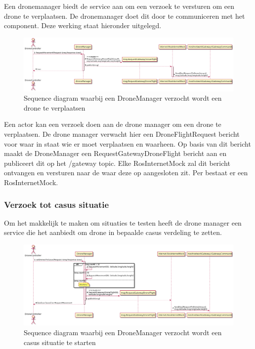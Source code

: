 \documentclass[a4paper, 11pt, oneside]{report}
\begin{document}
Een dronemanager biedt de service aan om een verzoek te versturen om een drone te verplaatsen. 
De dronemanager doet dit door te communiceren met het  component.
Deze werking staat hieronder uitgelegd.

\begin{figure}[H]
	\begin{center}\includegraphics[width=.95\linewidth]{UML/out/ros/sequence/RequestDroneMovement/RequestDroneMovement.png}\end{center}
	\caption{Sequence diagram waarbij een DroneManager verzocht wordt een drone te verplaatsen}
	\label{fig:ros:sequence:sequence:verplaatsingdrone}
\end{figure}

Een actor kan een verzoek doen aan de drone manager om een drone te verplaatsen.
De drone manager verwacht hier een DroneFlightRequest bericht voor waar in staat wie er moet verplaatsen en waarheen.
Op basis van dit bericht maakt de DroneManager een RequestGatewayDroneFlight bericht aan en publiceert dit op het /gateway topic.
Elke RosInternetMock zal dit bericht ontvangen en versturen naar de  waar deze op aangesloten zit.
Per  bestaat er een RosInternetMock.

\subsubsection{Verzoek tot casus situatie}
\label{DetailedDesign:ros:sequence:casus}

Om het makkelijk te maken om situaties te testen heeft de drone manager een service die het aanbiedt om drone in bepaalde casus verdeling te zetten.

\begin{figure}[H]
	\begin{center}\includegraphics[width=.95\linewidth]{UML/out/ros/sequence/CasusRequest/CasusRequest.png}\end{center}
	\caption{Sequence diagram waarbij een DroneManager verzocht wordt een casus situatie te starten}
	\label{fig:ros:sequence:sequence:casus}
\end{figure}
\end{document}
